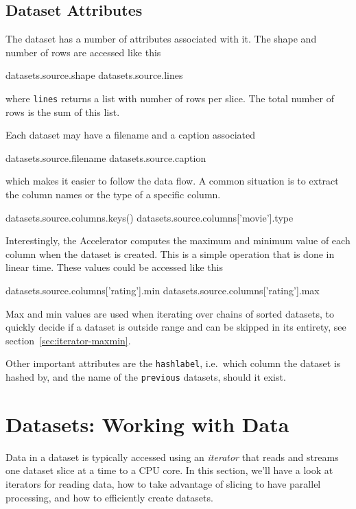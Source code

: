 \documentclass[a4paper]{article}
\begin{document}
\clearpage


\subsection{Dataset Attributes}
The dataset has a number of attributes associated with it.  The shape
and number of rows are accessed like this
\begin{python}
  datasets.source.shape
  datasets.source.lines
\end{python}
where \texttt{lines} returns a list with number of rows per slice.
The total number of rows is the sum of this list.

Each dataset may have a filename and a caption associated
\begin{python}
  datasets.source.filename
  datasets.source.caption
\end{python}
which makes it easier to follow the data flow.  A common situation is
to extract the column names or the type of a specific column.
\begin{python}
  datasets.source.columns.keys()
  datasets.source.columns['movie'].type
\end{python}

Interestingly, the Accelerator computes the maximum and minimum value
of each column when the dataset is created.  This is a simple
operation that is done in linear time.  These values could be accessed
like this
\begin{python}
  datasets.source.columns['rating'].min
  datasets.source.columns['rating'].max
\end{python}
Max and min values are used when iterating over chains of sorted
datasets, to quickly decide if a dataset is outside range and can be
skipped in its entirety, see section~\ref{sec:iterator-maxmin}.

Other important attributes are the \texttt{hashlabel}, i.e.\ which
column the dataset is hashed by, and the name of the \texttt{previous}
datasets, should it exist.

\clearpage




\section{Datasets: Working with Data}

Data in a dataset is typically accessed using an \emph{iterator} that
reads and streams one dataset slice at a time to a CPU core.  In this
section, we'll have a look at iterators for reading data, how to take
advantage of slicing to have parallel processing, and how to
efficiently create datasets.
\end{document}
